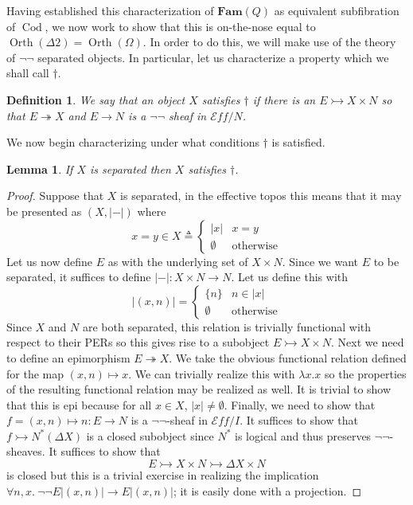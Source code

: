 \documentclass[12pt]{amsart}
\newcommand{\cat}[1]{\ensuremath{\mathbf{#1}}}
\newcommand{\eff}{\mathcal{E}\!f\!f}
\newcommand{\card}[1]{\ensuremath{\left\vert#1\right\vert}}
\newcommand{\epi}{\ensuremath{\twoheadrightarrow}}
\newcommand{\mono}{\ensuremath{\rightarrowtail}}
\DeclareMathOperator{\cod}{Cod}
\DeclareMathOperator{\orth}{Orth}
\newtheorem{lem}[thm]{Lemma}
\newtheorem{defn}[thm]{Definition}
\begin{document}
Having established this characterization of $\cat{Fam}(Q)$ as
equivalent subfibration of $\cod$, we now work to show that this is
on-the-nose equal to $\orth(\Delta 2) = \orth(\Omega)$. In order to do
this, we will make use of the theory of $\neg\neg$ separated
objects. In particular, let us characterize a property which we shall
call $\dagger$.
\begin{defn}\label{defn:orth:coveredsep}
  We say that an object $X$ satisfies $\dagger$ if there is an
  $E \mono X \times N$ so that $E \epi X$ and $E \to N$ is a
  $\neg\neg$ sheaf in $\eff/N$.
\end{defn}
We now begin characterizing under what conditions $\dagger$ is
satisfied.
\begin{lem}\label{lem:orth:sepimpliesdagger}
  If $X$ is separated then $X$ satisfies $\dagger$.
\end{lem}
\begin{proof}
  Suppose that $X$ is separated, in the effective topos this means
  that it may be presented as $(X, \card{-})$ where
  \[
    x = y \in X \triangleq
    \begin{cases}
      \card{x} & x = y\\
      \emptyset & \text{otherwise}
    \end{cases}
  \]
  Let us now define $E$ as with the underlying set of $X \times N$.
  Since we want $E$ to be separated, it suffices to define
  $\card{-} : X \times N \to N$. Let us define this with
  \[
    \card{(x, n)} =
    \begin{cases}
      \{n\} & n \in \card{x}\\
      \emptyset & \text{otherwise}
    \end{cases}
  \]
  Since $X$ and $N$ are both separated, this relation is trivially
  functional with respect to their PERs so this gives rise to a
  subobject $E \mono X \times N$. Next we need to define an
  epimorphism $E \epi X$. We take the obvious functional relation
  defined for the map $(x, n) \mapsto x$. We can trivially realize
  this with $\lambda x. x$ so the properties of the resulting
  functional relation may be realized as well. It is trivial to show
  that this is epi because for all $x \in X$,
  $\card{x} \neq \emptyset$. Finally, we need to show that
  $f = (x, n) \mapsto n : E \to N$ is a $\neg\neg$-sheaf in $\eff/I$. It
  suffices to show that $f \mono N^*(\Delta X)$ is a closed subobject
  since $N^*$ is logical and thus preserves $\neg\neg$-sheaves. It
  suffices to show that
  \[
    E \mono X \times N \mono \Delta X \times N
  \]
  is closed but this is a trivial exercise in realizing the
  implication $\forall n, x.\ \neg\neg E\card{(x, n)} \to E\card{(x, n)}$;
  it is easily done with a projection.
\end{proof}
\end{document}
